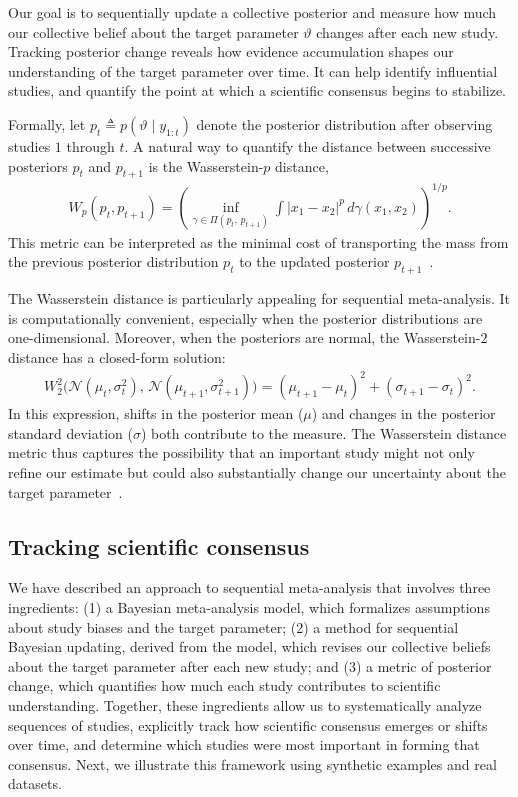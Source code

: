 Our goal is to sequentially update a collective posterior and measure how much our collective belief about the target parameter $\vartheta$ changes after each new study. Tracking posterior change reveals how evidence accumulation shapes our understanding of the target parameter over time. It can help identify influential studies, and quantify the point at which a scientific consensus begins to stabilize.

Formally, let $p_t \triangleq p(\vartheta \mid y_{1:t})$ denote the posterior distribution after observing studies $1$ through $t$. A natural way to quantify the distance between successive posteriors $p_t$ and $p_{t+1}$ is the Wasserstein-$p$ distance,
\begin{align}
\label{eq:LM}
W_p(p_t, p_{t+1}) = \left(\inf_{\gamma \in \Pi(p_t,\,p_{t+1})} \int |x_1 - x_2|^p \, d\gamma(x_1,x_2)\right)^{1/p}.
\end{align}
This metric can be interpreted as the minimal cost of transporting the mass from the previous posterior distribution $p_t$ to the updated posterior $p_{t+1}$~\citep{Villani_2008}.

The Wasserstein distance is particularly appealing for sequential meta-analysis. It is computationally convenient, especially when the posterior distributions are one-dimensional. Moreover, when the posteriors are normal, the Wasserstein-$2$ distance has a closed-form solution:
\begin{align}
W_2^2\bigl(\mathcal{N}(\mu_t,\sigma_t^2),\,\mathcal{N}(\mu_{t+1},\sigma_{t+1}^2)\bigr) = (\mu_{t+1} - \mu_t)^2 + (\sigma_{t+1} - \sigma_t)^2.\nonumber
\end{align}
In this expression, shifts in the posterior mean ($\mu$) and changes in the posterior standard deviation ($\sigma$) both contribute to the measure. The Wasserstein distance metric thus captures the possibility that an important study might not only refine our estimate but could also substantially change our uncertainty about the target parameter~\citep{mikhaeil2025b}.



\subsection{Tracking scientific consensus}

We have described an approach to sequential meta-analysis that involves three ingredients: (1) a Bayesian meta-analysis model, which formalizes assumptions about study biases and the target parameter; (2) a method for sequential Bayesian updating, derived from the model, which revises our collective beliefs about the target parameter after each new study; and
(3) a metric of posterior change, which quantifies how much each study contributes to scientific understanding. Together, these ingredients allow us to systematically analyze sequences of studies, explicitly track how scientific consensus emerges or shifts over time, and determine which studies were most important in forming that consensus. Next, we illustrate this framework using synthetic examples and real datasets.
